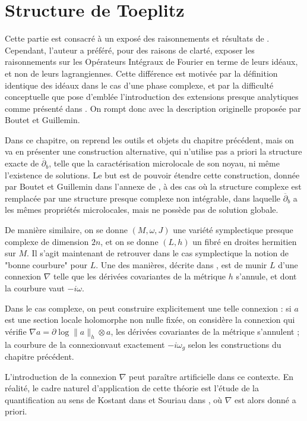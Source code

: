 \chapter{Structure de Toeplitz}

Cette partie est consacré à un exposé des raisonnements et résultats de \cite{Shiffman2002}. Cependant, l'auteur a préféré, pour des raisons de clarté, exposer les raisonnements sur les Opérateurs Intégraux de Fourier en terme de leurs idéaux, et non de leurs lagrangiennes. Cette différence est motivée par la définition identique des idéaux dans le cas d'une phase complexe, et par la difficulté conceptuelle que pose d'emblée l'introduction des extensions presque analytiques comme présenté dans \cite{melin1975fourier}. On rompt donc avec la description originelle proposée par Boutet et Guillemin.

Dans ce chapitre, on reprend les outils et objets du chapitre précédent, mais on va en présenter une construction alternative, qui n'utilise pas a priori la structure exacte de $\overline{\partial}_b$, telle que la caractérisation microlocale de son noyau, ni même l'existence de solutions. Le but est de pouvoir étendre cette construction, donnée par Boutet et Guillemin dans l'annexe de \cite{BoutetdeMonvel1981}, à des cas où la structure complexe est remplacée par une structure presque complexe non intégrable, dans laquelle $\overline{\partial}_b$ a les mêmes propriétés microlocales, mais ne possède pas de solution globale.

De manière similaire, on se donne $(M,\omega, J)$ une variété symplectique presque complexe de dimension $2n$, et on se donne $(L,h)$ un fibré en droites hermitien sur $M$. Il s'agit maintenant de retrouver dans le cas symplectique la notion de "bonne courbure" pour $L$. Une des manières, décrite dans \cite{woodhouse1997geometric}, est de munir $L$ d'une connexion $\nabla$ telle que les dérivées covariantes de la métrique $h$ s'annule, et dont la courbure vaut $-i\omega$. 

Dans le cas complexe, on peut construire explicitement une telle connexion : si $a$ est une section locale holomorphe non nulle fixée, on considère la connexion qui vérifie $\nabla a = \partial \log \|a\|_h \otimes a$, les dérivées covariantes de la métrique s'annulent ; la courbure de la connexionvaut exactement $-i\omega_g$ selon les constructions du chapitre précédent.

\begin{rem}L'introduction de la connexion $\nabla$ peut paraître artificielle dans ce contexte. En réalité, le cadre naturel d'application de cette théorie est l'étude de la quantification au sens de Kostant dans \cite{kostant1970quantization} et Souriau dans \cite{souriau1967quantification}, où $\nabla$ est alors donné a priori.\end{rem}

